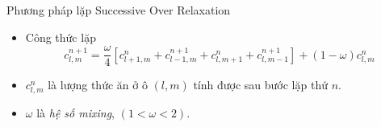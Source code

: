 \begin{frame}{Phương pháp lặp Successive Over Relaxation}
\begin{itemize}
    \item Công thức lặp
    \begin{equation}
    	c^{n + 1}_{l, m} = \frac{\omega}{4}[c^{n}_{l + 1, m} + c^{n + 1}_{l - 1, m} + c^{n}_{l, m + 1} + c^{n + 1}_{l, m - 1}] + (1 - \omega)c^{n}_{l, m}
	\end{equation}
	\item $c^{n}_{l, m}$ là lượng thức ăn ở ô $(l, m)$ tính được sau bước lặp thứ $n$.
	\item $\omega$ là \emph{hệ số mixing}, $(1 < \omega < 2)$.
\end{itemize}
\end{frame}